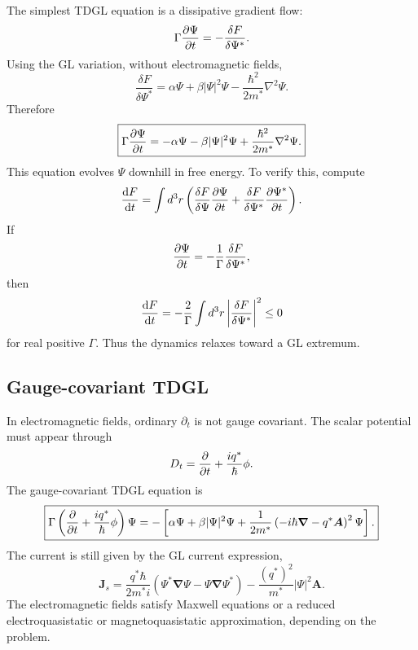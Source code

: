 \documentclass[11pt]{article}
\numberwithin{equation}{section}
\newcommand{\Avec}{\bm{A}}
\newcommand{\Jvec}{\bm{J}}
\renewcommand{\grad}{\bm{\nabla}}
\newcommand{\lap}{\nabla^2}
\newcommand{\Ord}{\Psi}
\newcommand{\GammaTD}{\Gamma}
\begin{document}
The simplest TDGL equation is a dissipative gradient flow:
\begin{equation}
\GammaTD\pdv{\Ord}{t}=-\frac{\delta F}{\delta \Ord^*}.
\end{equation}
Using the GL variation, without electromagnetic fields,
\begin{equation}
\frac{\delta F}{\delta \Ord^*}=\alpha\Ord+\beta|\Ord|^2\Ord-\frac{\hbar^2}{2m^*}\lap\Ord.
\end{equation}
Therefore
\begin{equation}
\boxed{\GammaTD\pdv{\Ord}{t}= -\alpha\Ord-\beta|\Ord|^2\Ord+\frac{\hbar^2}{2m^*}\lap\Ord.}
\label{eq:simple_tdgl}
\end{equation}
This equation evolves $\Ord$ downhill in free energy. To verify this, compute
\begin{equation}
\dv{F}{t}=\int d^3r\left(\frac{\delta F}{\delta\Ord}\pdv{\Ord}{t}+\frac{\delta F}{\delta\Ord^*}\pdv{\Ord^*}{t}\right).
\end{equation}
If
\begin{equation}
\pdv{\Ord}{t}=-\frac{1}{\GammaTD}\frac{\delta F}{\delta\Ord^*},
\end{equation}
then
\begin{equation}
\dv{F}{t}=-\frac{2}{\GammaTD}\int d^3r\left|\frac{\delta F}{\delta\Ord^*}\right|^2\le 0
\end{equation}
for real positive $\GammaTD$. Thus the dynamics relaxes toward a GL extremum.

\subsection{Gauge-covariant TDGL}

In electromagnetic fields, ordinary $\partial_t$ is not gauge covariant. The scalar potential must appear through
\begin{equation}
D_t=\pdv{}{t}+\frac{i q^*}{\hbar}\phi.
\end{equation}
The gauge-covariant TDGL equation is
\begin{equation}
\boxed{
\GammaTD\left(\pdv{}{t}+\frac{i q^*}{\hbar}\phi\right)\Ord
=-\left[\alpha\Ord+\beta|\Ord|^2\Ord+\frac{1}{2m^*}\left(-i\hbar\grad-q^*\Avec\right)^2\Ord\right].}
\label{eq:gauge_tdgl}
\end{equation}
The current is still given by the GL current expression,
\begin{equation}
\Jvec_s=\frac{q^*\hbar}{2m^*i}\left(\Ord^*\grad\Ord-\Ord\grad\Ord^*\right)-\frac{(q^*)^2}{m^*}|\Ord|^2\Avec.
\end{equation}
The electromagnetic fields satisfy Maxwell equations or a reduced electroquasistatic or magnetoquasistatic approximation, depending on the problem.
\end{document}
